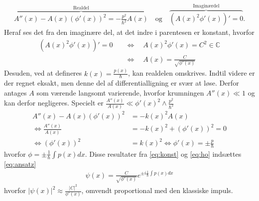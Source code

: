 \begin{align}
    \overbrace{A''(x) - A(x)\left( \phi'(x) \right)^{2} = - \frac{p^{2}}{\hbar^{2}}A(x)}^{\text{Realdel}} \quad \text{og} \quad%
    \overbrace{\left( A(x)^{2}\phi'(x) \right)' = 0}^{\text{Imaginærdel}}.
    \label{eq:realogimag}
\end{align}
Heraf ses det fra den imaginære del, at det indre i parentesen er konstant, hvorfor
\begin{align}
    \left( A(x)^{2}\phi'(x) \right)' = 0  \quad & \Leftrightarrow  \quad A(x)^{2}\phi'(x) = C^{2} \in \mathbb{C} \\
    & \Leftrightarrow  \quad A(x) = \frac{C}{\sqrt{\phi'(x)}}
    \label{eq:konst}
\end{align}
Desuden, ved at defineres $k(x) = \frac{p(x)}{\hbar}$, kan realdelen omskrives. Indtil videre er der regnet eksakt, men denne del af differentialligning er svær at løse. Derfor antages $A$ som værende langsomt varierende, hvorfor krumningen $A''(x)\ll 1$ og kan derfor negligeres. Specielt er $\frac{A''(x)}{A(x)} \ll \phi'(x)^{2}\wedge \frac{p^{2}}{\hbar^{2}}$
\begin{align}
    A''(x) - A(x)(\phi'(x))^{2} & =  -k(x)^{2}A(x)\\
    \Leftrightarrow \frac{A''(x)}{A(x)} & = -k(x)^{2} + (\phi'(x))^{2} = 0 \\
    \Leftrightarrow \left(\phi'(x)\right)^{2} & = k(x)^{2} \Leftrightarrow  \phi'(x) = \pm \frac{p}{\hbar}
    \label{eq:ho}
\end{align}
hvorfor $\phi = \pm \frac{1}{\hbar}\int p(x) dx$. Disse resultater fra \cref{eq:konst} og \cref{eq:ho} indsættes \cref{eq:ansatz}
\begin{align}
    \psi(x) = \frac{C}{\sqrt{\phi'(x)}}e^{\pm i\frac{1}{\hbar}\int p(x) dx}
    \label{eqpsi}
\end{align}
hvorfor $|\psi(x)|^2 \approx \frac{|C|^2}{\phi'(x)}$, omvendt proportional med den klassiske impuls.


